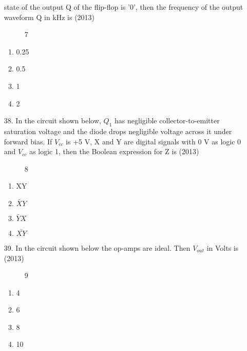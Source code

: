 \documentclass[journal]{IEEEtran}
\begin{document}
\begin{enumerate}
    state of the output Q of the flip-flop is '0', then the frequency of the output waveform Q in kHz is \hfill (2013)
    \begin{figure}[!ht]
        \centering
        \caption{7}
    \end{figure}
    \begin{enumerate}[label=(\Alph*)]
        \item 0.25
        \item 0.5
        \item 1
        \item 2
    \end{enumerate}
    \item[38.]  In the circuit shown below, $Q_1$ has negligible collector-to-emitter saturation voltage and the diode
    drops negligible voltage across it under forward bias. If $V_{cc}$ is +5 V, X and Y are digital signals
    with 0 V as logic 0 and $V_{cc}$ as logic 1, then the Boolean expression for Z is \hfill (2013)
    \begin{figure}[!ht]
        \centering
        \caption{8}
    \end{figure}
    \begin{enumerate}[label=(\Alph*)]
        \item XY
        \item $\bar{X}Y$
        \item $\bar{Y}X$
        \item $\bar{XY}$
    \end{enumerate}
    
    \item[39.] In the circuit shown below the op-amps are ideal. Then $V_{out}$ in Volts is \hfill (2013)
    \begin{figure}[!ht]
        \centering
        \caption{9}
    \end{figure}
    \begin{enumerate}[label=(\Alph*)]
        \item 4
        \item 6
        \item 8
        \item 10
    \end{enumerate} 
\end{enumerate}
\end{document}

